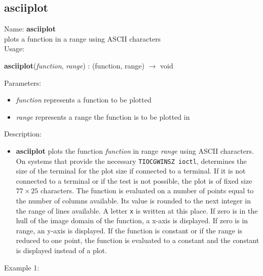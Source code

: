 \subsection{asciiplot}
\label{labasciiplot}
\noindent Name: \textbf{asciiplot}\\
plots a function in a range using ASCII characters\\
\noindent Usage: 
\begin{center}
\textbf{asciiplot}(\emph{function}, \emph{range}) : (\textsf{function}, \textsf{range}) $\rightarrow$ \textsf{void}
\end{center}
Parameters: 
\begin{itemize}
\item \emph{function} represents a function to be plotted
\item \emph{range} represents a range the function is to be plotted in 
\end{itemize}
\noindent Description: \begin{itemize}

\item \textbf{asciiplot} plots the function \emph{function} in range \emph{range} using ASCII
   characters.  On systems that provide the necessary 
   \texttt{TIOCGWINSZ ioctl}, \sollya determines the size of the
   terminal for the plot size if connected to a terminal. If it is not
   connected to a terminal or if the test is not possible, the plot is of
   fixed size $77\times25$ characters.  The function is
   evaluated on a number of points equal to the number of columns
   available. Its value is rounded to the next integer in the range of
   lines available. A letter \texttt{x} is written at this place. If zero is in
   the hull of the image domain of the function, a x-axis is
   displayed. If zero is in range, an y-axis is displayed.  If the
   function is constant or if the range is reduced to one point, the
   function is evaluated to a constant and the constant is displayed
   instead of a plot.
\end{itemize}
\noindent Example 1: 
